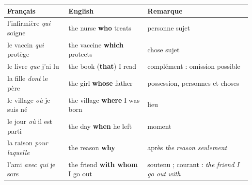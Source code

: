 \documentclass[11pt]{article}
\newcommand{\eng}[1]{\ifmmode\text{\textit{#1}}\else\begingroup\selectlanguage{english}\itshape #1\endgroup\fi}
\begin{document}
\begin{center}
\begin{tabularx}{\linewidth}{|X|X|X|}
\hline
\rowcolor{popblueL} Français & English & Remarque \\
\hline
l'infirmière \emph{qui} soigne & the nurse \textbf{who} treats & personne sujet \\
\hline
le vaccin \emph{qui} protège & the vaccine \textbf{which} protects & chose sujet \\
\hline
le livre \emph{que} j'ai lu & the book (\textbf{that}) I read & complément : omission possible \\
\hline
la fille \emph{dont} le père & the girl \textbf{whose} father & possession, personnes et choses \\
\hline
le village \emph{où} je suis né & the village \textbf{where} I was born & lieu \\
\hline
le jour \emph{où} il est parti & the day \textbf{when} he left & moment \\
\hline
la raison \emph{pour laquelle} & the reason \textbf{why} & après \eng{the reason} seulement \\
\hline
l'ami \emph{avec qui} je sors & the friend \textbf{with whom} I go out & soutenu ; courant : \eng{the friend I go out with} \\
\hline
\end{tabularx}
\end{center}
\end{document}
